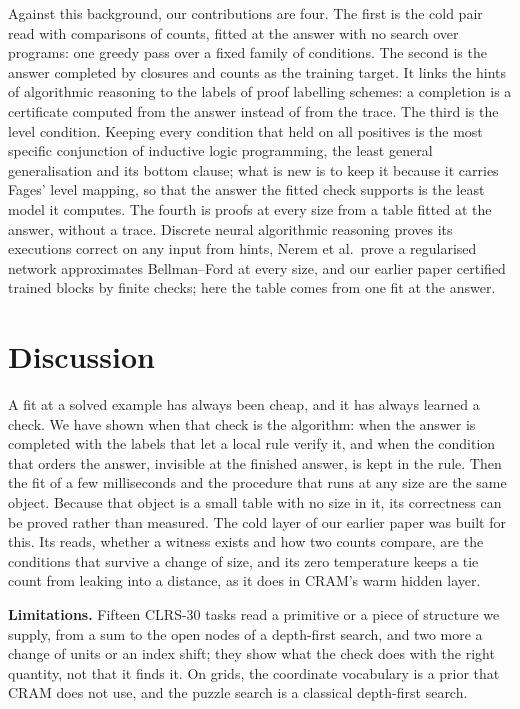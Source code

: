 \documentclass[10pt]{article}
\begin{document}
Against this background, our contributions are four. The first is the cold pair read with comparisons of counts,
fitted at the answer with no search over programs: one greedy pass over a fixed family of conditions. The second is
the answer completed by closures and counts as the training target. It links the hints of algorithmic reasoning to the
labels of proof labelling schemes: a completion is a certificate computed from the answer instead of from the trace.
The third is the level condition. Keeping every condition that held on all positives is the most specific conjunction
of inductive logic programming, the least general generalisation and its bottom clause\cite{plotkin1970note,muggleton1995inverse};
what is new is to keep it because it carries Fages' level mapping, so that the answer the fitted check supports is the
least model it computes. The fourth is proofs at every size from a table fitted at the answer, without a trace. Discrete
neural algorithmic reasoning proves its executions correct on any input from hints\cite{rodionov2025discrete}, Nerem
et al.\ prove a regularised network approximates Bellman--Ford at every size\cite{nerem2025graph}, and our earlier paper
certified trained blocks by finite checks\cite{mohsenvand2026zero}; here the table comes from one fit at the answer.
\section{Discussion}\label{sec:discussion}

A fit at a solved example has always been cheap, and it has always learned a check. We have shown when that check is
the algorithm: when the answer is completed with the labels that let a local rule verify it, and when the condition that
orders the answer, invisible at the finished answer, is kept in the rule. Then the fit of a few milliseconds and the
procedure that runs at any size are the same object. Because that object is a small table with no size in it, its
correctness can be proved rather than measured. The cold layer of our earlier paper was built for this. Its reads,
whether a witness exists and how two counts compare, are the conditions that survive a change of size, and its zero
temperature keeps a tie count from leaking into a distance, as it does in CRAM's warm hidden layer.

\textbf{Limitations.} Fifteen CLRS-30 tasks read a primitive or a piece of structure we supply, from a sum to the open
nodes of a depth-first search, and two more a change of units or an index shift; they show what the check does with the
right quantity, not that it finds it. On grids, the coordinate vocabulary
is a prior that CRAM does not use, and the puzzle search is a classical depth-first search.
\end{document}
